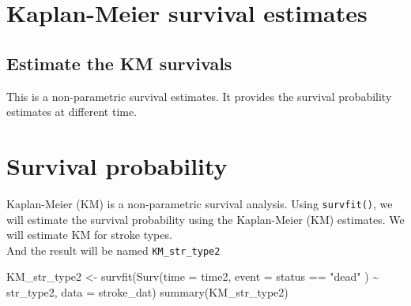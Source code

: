 \documentclass[
]{book}
\makeatletter
\newenvironment{Shaded}{\begin{snugshade}}{\end{snugshade}}
\newcommand{\AttributeTok}[1]{\textcolor[rgb]{0.61,0.61,0.61}{#1}}
\newcommand{\FunctionTok}[1]{\textcolor[rgb]{0,0,0}{#1}}
\newcommand{\NormalTok}[1]{#1}
\newcommand{\OtherTok}[1]{\textcolor[rgb]{0.37,0.37,0.37}{#1}}
\newcommand{\SpecialCharTok}[1]{\textcolor[rgb]{0,0,0}{#1}}
\newcommand{\StringTok}[1]{\textcolor[rgb]{0.5,0.5,0.5}{#1}}
\newenvironment{kframe}{%
\medskip{}
\setlength{\fboxsep}{.8em}
 \def\at@end@of@kframe{}%
 \ifinner\ifhmode%
  \def\at@end@of@kframe{\end{minipage}}%
  \begin{minipage}{\columnwidth}%
 \fi\fi%
 \def\FrameCommand##1{\hskip\@totalleftmargin \hskip-\fboxsep
 \colorbox{shadecolor}{##1}\hskip-\fboxsep
     \hskip-\linewidth \hskip-\@totalleftmargin \hskip\columnwidth}%
 \MakeFramed {\advance\hsize-\width
   \@totalleftmargin\z@ \linewidth\hsize
   \@setminipage}}%
 {\par\unskip\endMakeFramed%
 \at@end@of@kframe}
\renewenvironment{Shaded}{\begin{kframe}}{\end{kframe}}
\makeatother
\begin{document}
\hypertarget{kaplan-meier-survival-estimates}{%
\section{Kaplan-Meier survival estimates}\label{kaplan-meier-survival-estimates}}

\hypertarget{estimate-the-km-survivals}{%
\subsection{Estimate the KM survivals}\label{estimate-the-km-survivals}}

This is a non-parametric survival estimates. It provides the survival probability estimates at different time.

\hypertarget{survival-probability}{%
\section{Survival probability}\label{survival-probability}}

Kaplan-Meier (KM) is a non-parametric survival analysis. Using \texttt{survfit()}, we will estimate the survival probability using the Kaplan-Meier (KM) estimates. We will estimate KM for stroke types.\\
And the result will be named \texttt{KM\_str\_type2}

\begin{Shaded}
\begin{Highlighting}[]
\NormalTok{KM\_str\_type2 }\OtherTok{\textless{}{-}} \FunctionTok{survfit}\NormalTok{(}\FunctionTok{Surv}\NormalTok{(}\AttributeTok{time =}\NormalTok{ time2, }\AttributeTok{event =}\NormalTok{ status }\SpecialCharTok{==} \StringTok{"dead"}\NormalTok{ ) }\SpecialCharTok{\textasciitilde{}}\NormalTok{ str\_type2, }
                        \AttributeTok{data =}\NormalTok{ stroke\_dat)}
\FunctionTok{summary}\NormalTok{(KM\_str\_type2)}
\end{Highlighting}
\end{Shaded}
\end{document}
